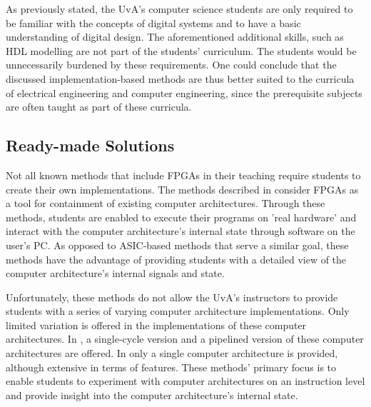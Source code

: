\documentclass[openright]{template/uva-bachelor-thesis}
\begin{document}
As previously stated, the UvA's computer science students are only required to be familiar with the concepts of digital systems and to have a basic understanding of digital design. The aforementioned additional skills, such as HDL modelling are not part of the students' curriculum. The students would be unnecessarily burdened by these requirements. One could conclude that the discussed implementation-based methods are thus better suited to the curricula of electrical engineering and computer engineering, since the prerequisite subjects are often taught as part of these curricula. 





\subsection{Ready-made Solutions}

Not all known methods that include FPGAs in their teaching require students to create their own implementations. The methods described in \cite{holland2003harnessing, bulic2013fpga, mipsfpga} consider FPGAs as a tool for containment of existing computer architectures. Through these methods, students are enabled to execute their programs on 'real hardware' and interact with the computer architecture's internal state through software on the user's PC. As opposed to ASIC-based methods that serve a similar goal, these methods have the advantage of providing students with a detailed view of the computer architecture's internal signals and state.

Unfortunately, these methods do not allow the UvA's instructors to provide students with a series of varying computer architecture implementations. Only limited variation is offered in the implementations of these computer architectures. In \cite{holland2003harnessing, bulic2013fpga}, a single-cycle version and a pipelined version of these computer architectures are offered. In \cite{mipsfpga} only a single computer architecture is provided, although extensive in terms of features. These methods' primary focus is to enable students to experiment with computer architectures on an instruction level and provide insight into the computer architecture's internal state. 
\end{document}
